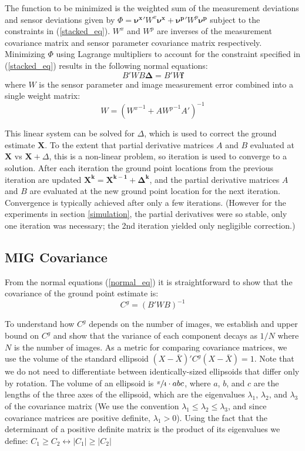 \documentclass[10pt]{amsart}
\newcommand{\grnd}{\pmb{X}}
\begin{document}
The function to be minimized is the weighted sum of the measurement deviations
and sensor deviations given by 
$\Phi = \pmb{\nu^x}' W^x \pmb{\nu^x} + \pmb{\nu^p}' W^p \pmb{\nu^p}$ 
subject to the constraints in (\ref{stacked_eq}).
$W^x$ and $W^p$ are inverses of the measurement covariance matrix and sensor
parameter covariance matrix respectively. Minimizing $\Phi$ using Lagrange multipliers 
to account for the constraint specified in (\ref{stacked_eq}) results in the following normal equations:
\begin{equation} \label{normal_eq}
B' W B\pmb{\Delta} = B' W \pmb{f}
\end{equation}
where $W$ is the sensor parameter and image measurement error combined into a single weight matrix:
\begin{equation}\label{weight_eq}
W = ({W^x}^{-1} + A {W^p}^{-1} {A}')^{-1}
\end{equation}

This linear system can be solved for $\Delta$, which is used to correct the
ground estimate $\grnd$. To the extent that partial derivative matrices $A$
and $B$ evaluated at $\grnd$ vs $\grnd+\Delta$, this is a non-linear
problem, so iteration is used to converge to a solution.  After each iteration
the ground point locations from the previous iteration are updated $\pmb{X^k} =
\pmb{X^{k - 1}} + \pmb{\Delta^k}$, and the partial derivative matrices $A$ and
$B$ are evaluated at the new ground point location for the next iteration.
Convergence is typically achieved after only a few iterations. (However for the
experiments in section \ref{simulation}, the partial derivatives were so stable,
only one iteration was necessary; the 2nd iteration yielded only negligible
correction.)

\subsection{MIG Covariance}
From the normal equations (\ref{normal_eq}) it is straightforward to show that
the covariance of the ground point estimate is:
\begin{equation} \label{covariance_eq}
C^g = (B'WB)^{-1}
\end{equation}

To understand how $C^g$ depends on the number of images, we establish and upper
bound on $C^g$ and show that the variance of each component decays as $1/N$
where $N$ is the number of images.  As a metric for comparing covariance
matrices, we use the volume of the standard ellipsoid $(X - \bar{X})'C^g(X -
\bar{X}) = 1$.  Note that we do not need to differentiate between
identically-sized ellipsoids that differ only by rotation.  The volume of an
ellipsoid is $\sfrac{\pi}{4}\cdot abc$, where $a$, $b$, and $c$ are the lengths of the three
axes of the ellipsoid, which are the eigenvalues $\lambda_1$, $\lambda_2$, and
$\lambda_3$ of the covariance matrix (We use the convention $\lambda_1 \le
\lambda_2 \le \lambda_3$, and since covariance matrices are positive definite,
$\lambda_1 > 0$).  Using the fact that the determinant of a positive definite
matrix is the product of its eigenvalues we define: $C_1 \ge C_2 \leftrightarrow
|C_1| \ge |C_2|$
\end{document}
